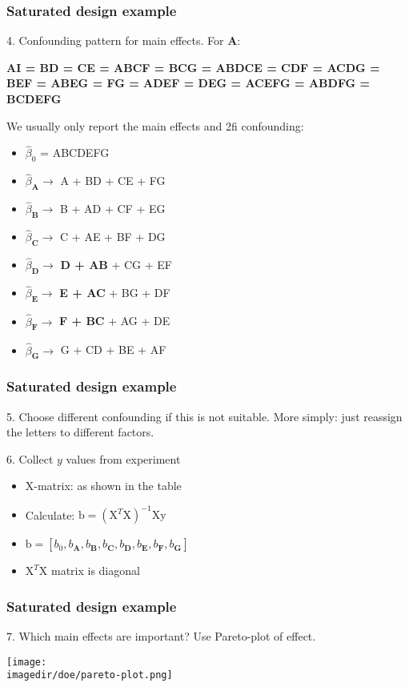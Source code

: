 \begin{frame}\frametitle{Saturated design example}

	4. Confounding pattern for main effects. For \textbf{A}:

	\textbf{AI = BD = CE = ABCF = BCG = ABDCE = CDF = ACDG = BEF = ABEG = FG = ADEF = DEG = ACEFG = ABDFG = BCDEFG}

	We usually only report the main effects and 2fi confounding:
	\begin{itemize}
		\item	$\widehat{\beta}_0$ = ABCDEFG
		\item	$\widehat{\beta}_{\mathbf{A}} \rightarrow$ A + BD + CE + FG
		\item	$\widehat{\beta}_{\mathbf{B}} \rightarrow$ B + AD + CF + EG
		\item	$\widehat{\beta}_{\mathbf{C}} \rightarrow$ C + AE + BF + DG
		\item	$\widehat{\beta}_{\mathbf{D}} \rightarrow$ \textbf{D + AB} + CG + EF
		\item	$\widehat{\beta}_{\mathbf{E}} \rightarrow$ \textbf{E + AC} + BG + DF
		\item	$\widehat{\beta}_{\mathbf{F}} \rightarrow$ \textbf{F + BC} + AG + DE
		\item	$\widehat{\beta}_{\mathbf{G}} \rightarrow$ G + CD + BE + AF
	\end{itemize}
\end{frame}

\begin{frame}\frametitle{Saturated design example}

	5. Choose different confounding if this is not suitable. More simply: just reassign the letters to different factors.

	6. Collect $y$ values from experiment
	\begin{itemize}
		\item	X-matrix: as shown in the table
		\item	Calculate: $\mathrm{b} = \left(\mathrm{X}^T\mathrm{X}\right)^{-1}\mathrm{X}\mathrm{y}$
		\item	$\mathrm{b} = [b_0, b_\mathbf{A}, b_\mathbf{B}, b_\mathbf{C}, b_\mathbf{D}, b_\mathbf{E}, b_\mathbf{F}, b_\mathbf{G}]$
		\item	$\mathrm{X}^T\mathrm{X}$ matrix is diagonal
	\end{itemize}
\end{frame}

\begin{frame}\frametitle{Saturated design example}

	7. Which main effects are important? Use Pareto-plot of effect.
	\begin{center}
		\texttt{[image: \\imagedir/doe/pareto-plot.png]}
	\end{center}
\end{frame}

